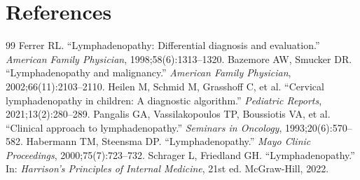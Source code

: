 \section*{References}
\begin{thebibliography}{99}
 Ferrer RL. ``Lymphadenopathy: Differential diagnosis and evaluation.'' \textit{American Family Physician}, 1998;58(6):1313--1320.
 Bazemore AW, Smucker DR. ``Lymphadenopathy and malignancy.'' \textit{American Family Physician}, 2002;66(11):2103--2110.
 Heilen M, Schmid M, Grasshoff C, et al. ``Cervical lymphadenopathy in children: A diagnostic algorithm.'' \textit{Pediatric Reports}, 2021;13(2):280--289.
 Pangalis GA, Vassilakopoulos TP, Boussiotis VA, et al. ``Clinical approach to lymphadenopathy.'' \textit{Seminars in Oncology}, 1993;20(6):570--582.
 Habermann TM, Steensma DP. ``Lymphadenopathy.'' \textit{Mayo Clinic Proceedings}, 2000;75(7):723--732.
 Schrager L, Friedland GH. ``Lymphadenopathy.'' In: \textit{Harrison's Principles of Internal Medicine}, 21st ed. McGraw-Hill, 2022.
\end{thebibliography}
